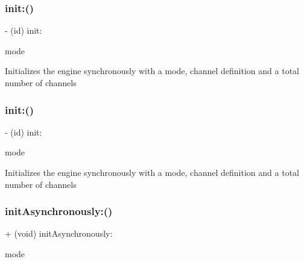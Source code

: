 \subsubsection{\texorpdfstring{init\+:()}{init:()}\hspace{0.1cm}{\footnotesize\ttfamily [3/4]}}
{\footnotesize\ttfamily -\/ (id) init\+: \begin{DoxyParamCaption}\item[{(t\+Audio\+Manager\+Mode)}]{mode }\end{DoxyParamCaption}}

Initializes the engine synchronously with a mode, channel definition and a total number of channels \mbox{\label{interfaceCDAudioManager_ae2d8ef3daed8297ee37cd14b67687407}} 
\subsubsection{\texorpdfstring{init\+:()}{init:()}\hspace{0.1cm}{\footnotesize\ttfamily [4/4]}}
{\footnotesize\ttfamily -\/ (id) init\+: \begin{DoxyParamCaption}\item[{(t\+Audio\+Manager\+Mode)}]{mode }\end{DoxyParamCaption}}

Initializes the engine synchronously with a mode, channel definition and a total number of channels \mbox{\label{interfaceCDAudioManager_a208d173cd07d3ace248aff4bb16839b9}} 
\subsubsection{\texorpdfstring{init\+Asynchronously\+:()}{initAsynchronously:()}\hspace{0.1cm}{\footnotesize\ttfamily [1/4]}}
{\footnotesize\ttfamily + (void) init\+Asynchronously\+: \begin{DoxyParamCaption}\item[{(t\+Audio\+Manager\+Mode)}]{mode }\end{DoxyParamCaption}}

